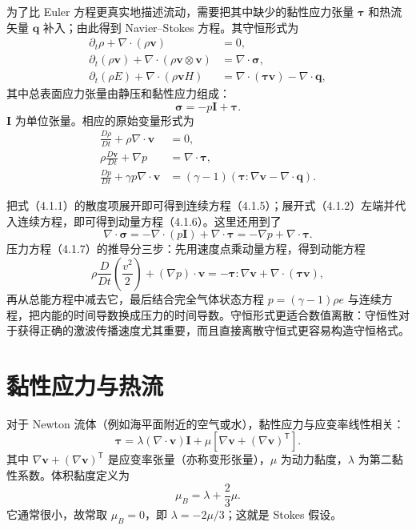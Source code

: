\documentclass[11pt,a4paper,openany,fontset=none]{ctexbook}
\begin{document}
为了比 Euler 方程更真实地描述流动，需要把其中缺少的黏性应力张量 $\bm\tau$ 和热流矢量 $\bm q$ 补入；由此得到 Navier--Stokes 方程。其守恒形式为
\begin{align}
 \partial_t\rho+\nabla\cdot(\rho\bm v)&=0, \tag{4.1.1}\\
 \partial_t(\rho\bm v)+\nabla\cdot(\rho\bm v\otimes\bm v)&=\nabla\cdot\bm\sigma, \tag{4.1.2}\\
 \partial_t(\rho E)+\nabla\cdot(\rho\bm vH)&=\nabla\cdot(\bm\tau\bm v)-\nabla\cdot\bm q, \tag{4.1.3}
\end{align}
其中总表面应力张量由静压和黏性应力组成：
\begin{equation}
 \bm\sigma=-p\bm I+\bm\tau . \tag{4.1.4}
\end{equation}
$\bm I$ 为单位张量。相应的原始变量形式为
\begin{align}
 \frac{D\rho}{Dt}+\rho\nabla\cdot\bm v&=0, \tag{4.1.5}\\
 \rho\frac{D\bm v}{Dt}+\nabla p&=\nabla\cdot\bm\tau, \tag{4.1.6}\\
 \frac{Dp}{Dt}+\gamma p\nabla\cdot\bm v&=(\gamma-1)\left(\bm\tau:\nabla\bm v-\nabla\cdot\bm q\right). \tag{4.1.7}
\end{align}

把式（4.1.1）的散度项展开即可得到连续方程（4.1.5）；展开式（4.1.2）左端并代入连续方程，即可得到动量方程（4.1.6）。这里还用到了
\begin{equation}
 \nabla\cdot\bm\sigma=-\nabla\cdot(p\bm I)+\nabla\cdot\bm\tau=-\nabla p+\nabla\cdot\bm\tau. \tag{4.1.8}
\end{equation}
压力方程（4.1.7）的推导分三步：先用速度点乘动量方程，得到动能方程
\begin{equation}
 \rho\frac{D}{Dt}\left(\frac{v^2}{2}\right)+(\nabla p)\cdot\bm v
 =-\bm\tau:\nabla\bm v+\nabla\cdot(\bm\tau\bm v), \tag{4.1.9}
\end{equation}
再从总能方程中减去它，最后结合完全气体状态方程 $p=(\gamma-1)\rho e$ 与连续方程，把内能的时间导数换成压力的时间导数。守恒形式更适合数值离散：守恒性对于获得正确的激波传播速度尤其重要，而且直接离散守恒式更容易构造守恒格式。

\section{黏性应力与热流}

对于 Newton 流体（例如海平面附近的空气或水），黏性应力与应变率线性相关：
\begin{equation}
 \bm\tau=\lambda(\nabla\cdot\bm v)\bm I+
 \mu\left[\nabla\bm v+(\nabla\bm v)^{\mathsf T}\right]. \tag{4.2.1}
\end{equation}
其中 $\nabla\bm v+(\nabla\bm v)^{\mathsf T}$ 是应变率张量（亦称变形张量），$\mu$ 为动力黏度，$\lambda$ 为第二黏性系数。体积黏度定义为
\begin{equation}
 \mu_B=\lambda+\frac{2}{3}\mu. \tag{4.2.2}
\end{equation}
它通常很小，故常取 $\mu_B=0$，即 $\lambda=-2\mu/3$；这就是 Stokes 假设。
\end{document}
